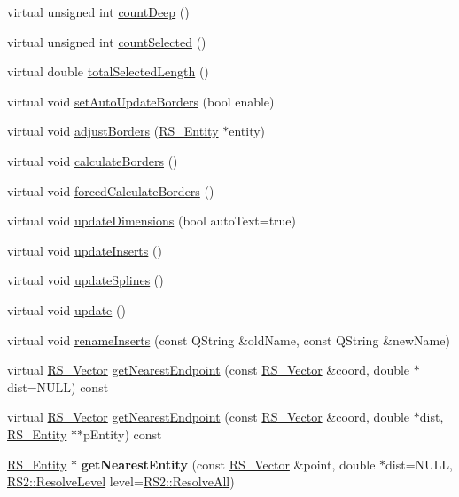 \begin{DoxyCompactItemize}
\item 
virtual unsigned int \hyperlink{classRS__EntityContainer_afc07dd92c0d94efbd572513c9fa2270c}{count\-Deep} ()
\item 
virtual unsigned int \hyperlink{classRS__EntityContainer_af563679ce721440d821a6b08520795e5}{count\-Selected} ()
\item 
virtual double \hyperlink{classRS__EntityContainer_aed40d5e12544d3158d5c2d09aac3cc47}{total\-Selected\-Length} ()
\item 
virtual void \hyperlink{classRS__EntityContainer_acce1fa66086da9ea1e622992dc3de246}{set\-Auto\-Update\-Borders} (bool enable)
\item 
virtual void \hyperlink{classRS__EntityContainer_aa6d3d87cdbc911a96e11a6f66a1b8588}{adjust\-Borders} (\hyperlink{classRS__Entity}{R\-S\-\_\-\-Entity} $\ast$entity)
\item 
virtual void \hyperlink{classRS__EntityContainer_a852ac3bad97f3c3fff80f0a83c6862d7}{calculate\-Borders} ()
\item 
virtual void \hyperlink{classRS__EntityContainer_a7e152711eace18a2929080621e08e499}{forced\-Calculate\-Borders} ()
\item 
virtual void \hyperlink{classRS__EntityContainer_afef42f1833916476d0137257b58fe658}{update\-Dimensions} (bool auto\-Text=true)
\item 
virtual void \hyperlink{classRS__EntityContainer_a89f055646f06a1e201e3749434736f9c}{update\-Inserts} ()
\item 
virtual void \hyperlink{classRS__EntityContainer_ae76f8828a8986b1e9111dd67daa35e1f}{update\-Splines} ()
\item 
virtual void \hyperlink{classRS__EntityContainer_a684d16893e76812fd194ceac56a03730}{update} ()
\item 
virtual void \hyperlink{classRS__EntityContainer_ab327df807b95361ea477864bdae0d6f4}{rename\-Inserts} (const Q\-String \&old\-Name, const Q\-String \&new\-Name)
\item 
virtual \hyperlink{classRS__Vector}{R\-S\-\_\-\-Vector} \hyperlink{classRS__EntityContainer_a4489ea8efab805e50958ead1ac9a79e8}{get\-Nearest\-Endpoint} (const \hyperlink{classRS__Vector}{R\-S\-\_\-\-Vector} \&coord, double $\ast$dist=N\-U\-L\-L) const 
\item 
virtual \hyperlink{classRS__Vector}{R\-S\-\_\-\-Vector} \hyperlink{classRS__EntityContainer_ad0538845d91462b842f3b3b3e30922c0}{get\-Nearest\-Endpoint} (const \hyperlink{classRS__Vector}{R\-S\-\_\-\-Vector} \&coord, double $\ast$dist, \hyperlink{classRS__Entity}{R\-S\-\_\-\-Entity} $\ast$$\ast$p\-Entity) const 
\item 
\hypertarget{classRS__EntityContainer_aba756af3dcbcdd018b4f12fd8729ca1b}{\hyperlink{classRS__Entity}{R\-S\-\_\-\-Entity} $\ast$ {\bfseries get\-Nearest\-Entity} (const \hyperlink{classRS__Vector}{R\-S\-\_\-\-Vector} \&point, double $\ast$dist=N\-U\-L\-L, \hyperlink{classRS2_a1b2c5e3a3e9d1b03a9564229255faa20}{R\-S2\-::\-Resolve\-Level} level=\hyperlink{classRS2_a1b2c5e3a3e9d1b03a9564229255faa20a2a4a53124bbf724f5f486e1066d99a74}{R\-S2\-::\-Resolve\-All})}\label{classRS__EntityContainer_aba756af3dcbcdd018b4f12fd8729ca1b}


\end{DoxyCompactItemize}
